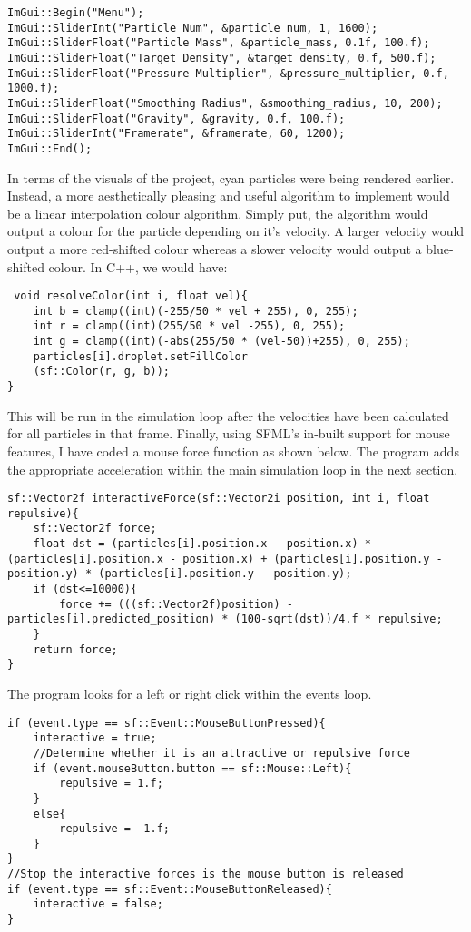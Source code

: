 \documentclass[write-up.tex]{subfiles}
\begin{document}
\begin{lstlisting}
ImGui::Begin("Menu");
ImGui::SliderInt("Particle Num", &particle_num, 1, 1600);
ImGui::SliderFloat("Particle Mass", &particle_mass, 0.1f, 100.f);
ImGui::SliderFloat("Target Density", &target_density, 0.f, 500.f);
ImGui::SliderFloat("Pressure Multiplier", &pressure_multiplier, 0.f, 1000.f);
ImGui::SliderFloat("Smoothing Radius", &smoothing_radius, 10, 200);
ImGui::SliderFloat("Gravity", &gravity, 0.f, 100.f);
ImGui::SliderInt("Framerate", &framerate, 60, 1200);
ImGui::End();
\end{lstlisting}

In terms of the visuals of the project, cyan particles were being rendered earlier. Instead, a more aesthetically pleasing and useful algorithm to implement would be a linear interpolation colour algorithm. Simply put, the algorithm would output a colour for the particle depending on it's velocity. A larger velocity would output a more red-shifted colour whereas a slower velocity would output a blue-shifted colour. In C++, we would have:

\begin{lstlisting}
 void resolveColor(int i, float vel){
    int b = clamp((int)(-255/50 * vel + 255), 0, 255);
    int r = clamp((int)(255/50 * vel -255), 0, 255);
    int g = clamp((int)(-abs(255/50 * (vel-50))+255), 0, 255);
    particles[i].droplet.setFillColor
    (sf::Color(r, g, b));
}
\end{lstlisting}
This will be run in the simulation loop after the velocities have been calculated for all particles in that frame. Finally, using SFML's in-built support for mouse features, I have coded a mouse force function as shown below. The program adds the appropriate acceleration within the main simulation loop in the next section.

\begin{lstlisting}
sf::Vector2f interactiveForce(sf::Vector2i position, int i, float repulsive){
    sf::Vector2f force;
    float dst = (particles[i].position.x - position.x) * (particles[i].position.x - position.x) + (particles[i].position.y - position.y) * (particles[i].position.y - position.y);
    if (dst<=10000){
        force += (((sf::Vector2f)position) - particles[i].predicted_position) * (100-sqrt(dst))/4.f * repulsive;
    }
    return force;
}
\end{lstlisting}
The program looks for a left or right click within the events loop.
\begin{lstlisting}
if (event.type == sf::Event::MouseButtonPressed){
    interactive = true;
    //Determine whether it is an attractive or repulsive force
    if (event.mouseButton.button == sf::Mouse::Left){
        repulsive = 1.f;
    }
    else{
        repulsive = -1.f;
    }
}
//Stop the interactive forces is the mouse button is released
if (event.type == sf::Event::MouseButtonReleased){
    interactive = false;
}
\end{lstlisting}
\end{document}
